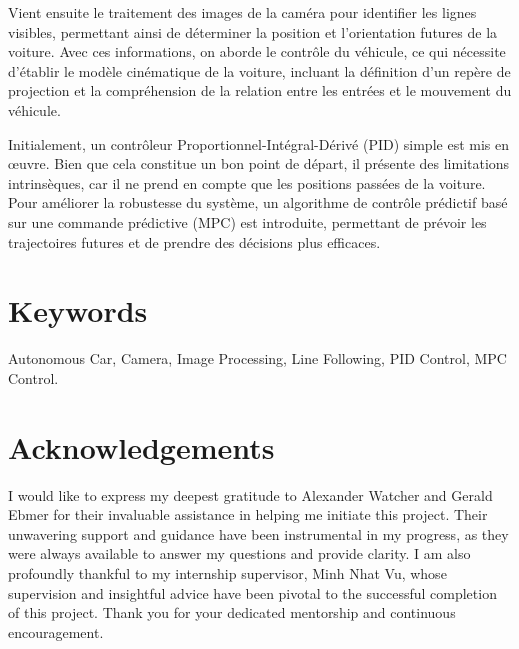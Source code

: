 Vient ensuite le traitement des images de la cam\'era pour identifier les lignes visibles, permettant ainsi de d\'eterminer la position et l'orientation futures de la voiture. Avec ces informations, on aborde le contr\^ole du v\'ehicule, ce qui n\'ecessite d'\'etablir le mod\`ele cin\'ematique de la voiture, incluant la d\'efinition d'un rep\`ere de projection et la compr\'ehension de la relation entre les entr\'ees et le mouvement du v\'ehicule.

Initialement, un contr\^oleur Proportionnel-Int\'egral-D\'eriv\'e (\acs{PID}) simple est mis en \oe uvre. Bien que cela constitue un bon point de d\'epart, il pr\'esente des limitations intrins\`eques, car il ne prend en compte que les positions pass\'ees de la voiture. Pour am\'eliorer la robustesse du syst\`eme, un algorithme de contr\^ole pr\'edictif bas\'e sur une commande pr\'edictive (\acs{MPC}) est introduite, permettant de pr\'evoir les trajectoires futures et de prendre des d\'ecisions plus efficaces.



\section*{Keywords}
Autonomous Car, Camera, Image Processing, Line Following, \acs{PID} Control, \acs{MPC} Control.



\section*{Acknowledgements}

I would like to express my deepest gratitude to Alexander Watcher and Gerald Ebmer for their invaluable assistance in helping me initiate this project. Their unwavering support and guidance have been instrumental in my progress, as they were always available to answer my questions and provide clarity. I am also profoundly thankful to my internship supervisor, Minh Nhat Vu, whose supervision and insightful advice have been pivotal to the successful completion of this project. Thank you for your dedicated mentorship and continuous encouragement.

